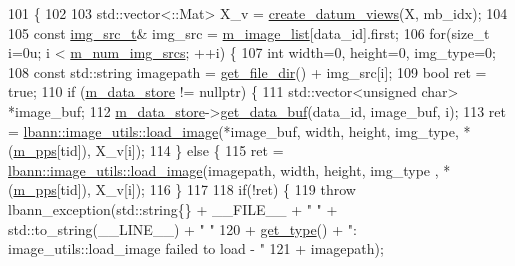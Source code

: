 \begin{DoxyCode}
101                                                                                    \{
102 
103   std::vector<::Mat> X\_v = \hyperlink{classlbann_1_1data__reader__multi__images_a713e4cc80a2d3a2b721d0912e3773baa}{create\_datum\_views}(X, mb\_idx);
104 
105   \textcolor{keyword}{const} \hyperlink{classlbann_1_1data__reader__multi__images_ac817914ad82e09471f13fce5b0b5faef}{img\_src\_t}& img\_src = \hyperlink{classlbann_1_1data__reader__multi__images_a6d8e2d161c9efff1ac70f847b4a7e9d0}{m\_image\_list}[data\_id].first;
106   \textcolor{keywordflow}{for}(\textcolor{keywordtype}{size\_t} i=0u; i < \hyperlink{classlbann_1_1data__reader__multi__images_a70752a5442e99333fec52def9eadc58f}{m\_num\_img\_srcs}; ++i) \{
107     \textcolor{keywordtype}{int} width=0, height=0, img\_type=0;
108     \textcolor{keyword}{const} std::string imagepath = \hyperlink{classlbann_1_1generic__data__reader_ab4c6c2d4ba40ece809ce896828c8ff03}{get\_file\_dir}() + img\_src[i];
109     \textcolor{keywordtype}{bool} ret = \textcolor{keyword}{true};
110     \textcolor{keywordflow}{if} (\hyperlink{classlbann_1_1generic__data__reader_aefc076b842933a882214f4f709ca49c9}{m\_data\_store} != \textcolor{keyword}{nullptr}) \{
111       std::vector<unsigned char> *image\_buf;
112       \hyperlink{classlbann_1_1generic__data__reader_aefc076b842933a882214f4f709ca49c9}{m\_data\_store}->\hyperlink{classlbann_1_1generic__data__store_a2abb3d0327b528d36e23fcef9b937798}{get\_data\_buf}(data\_id, image\_buf, i);
113       ret = \hyperlink{classlbann_1_1image__utils_ac324a04f877601387cfb10750f1f6b8d}{lbann::image\_utils::load\_image}(*image\_buf, width, height, 
      img\_type, *(\hyperlink{classlbann_1_1imagenet__reader_a1e0d0ed4ac529de3e9f735512f5e3dd8}{m\_pps}[tid]), X\_v[i]);
114     \} \textcolor{keywordflow}{else} \{
115       ret = \hyperlink{classlbann_1_1image__utils_ac324a04f877601387cfb10750f1f6b8d}{lbann::image\_utils::load\_image}(imagepath, width, height, img\_type
      , *(\hyperlink{classlbann_1_1imagenet__reader_a1e0d0ed4ac529de3e9f735512f5e3dd8}{m\_pps}[tid]), X\_v[i]);
116     \}
117   
118     \textcolor{keywordflow}{if}(!ret) \{
119       \textcolor{keywordflow}{throw} lbann\_exception(std::string\{\} + \_\_FILE\_\_ + \textcolor{stringliteral}{" "} + std::to\_string(\_\_LINE\_\_) + \textcolor{stringliteral}{" "}
120                             + \hyperlink{classlbann_1_1data__reader__multi__images_a9939a88a40caf7b2a27de08deca54ac1}{get\_type}() + \textcolor{stringliteral}{": image\_utils::load\_image failed to load - "}
121                             + imagepath);

\end{DoxyCode}
